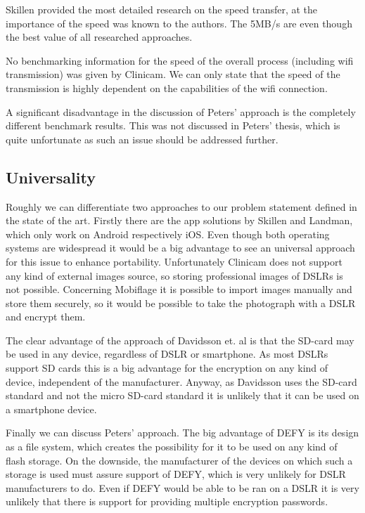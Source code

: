 \documentclass[12pt,a4paper,titlepage,oneside]{scrartcl}
\begin{document}
Skillen provided the most detailed research on the speed transfer, at the importance of the speed was known to the authors.
The 5MB/s are even though the best value of all researched approaches.

No benchmarking information for the speed of the overall process (including wifi transmission) was given by Clinicam.
We can only state that the speed of the transmission is highly dependent on the capabilities of the wifi connection.

A significant disadvantage in the discussion of Peters' approach is the completely different benchmark results.
This was not discussed in Peters' thesis, which is quite unfortunate as such an issue should be addressed further.

\subsection{Universality}
Roughly we can differentiate two approaches to our problem statement defined in the state of the art.
Firstly there are the app solutions by Skillen and Landman, which only work on Android respectively iOS.
Even though both operating systems are widespread it would be a big advantage to see an universal approach for this issue to enhance portability.
Unfortunately Clinicam does not support any kind of external images source, so storing professional images of DSLRs is not possible.
Concerning Mobiflage it is possible to import images manually and store them securely, so it would be possible to take the photograph with a DSLR and encrypt them.

The clear advantage of the approach of Davidsson et. al \cite{Davidsson2016} is that the SD-card may be used in any device, regardless of DSLR or smartphone.
As most DSLRs support SD cards this is a big advantage for the encryption on any kind of device, independent of the manufacturer.
Anyway, as Davidsson uses the SD-card standard and not the micro SD-card standard it is unlikely that it can be used on a smartphone device.

Finally we can discuss Peters' approach.
The big advantage of DEFY is its design as a file system, which creates the possibility for it to be used on any kind of flash storage.
On the downside, the manufacturer of the devices on which such a storage is used must assure support of DEFY, which is very unlikely for DSLR manufacturers to do.
Even if DEFY would be able to be ran on a DSLR it is very unlikely that there is support for providing multiple encryption passwords.
\end{document}
